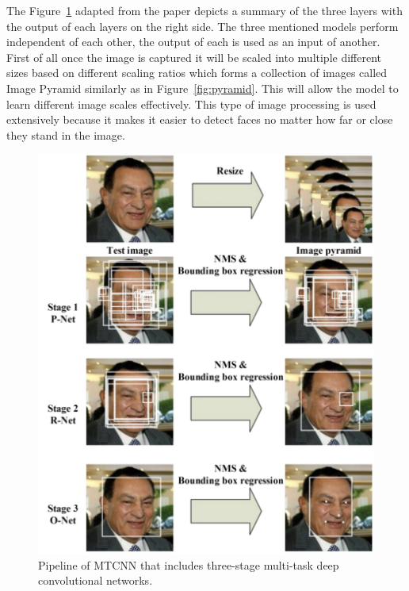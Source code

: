 The Figure~\ref{fig:mtcnn} adapted from the paper depicts a summary of the three layers with the output of each layers on the right side. The three mentioned models perform independent of each other, the output of each is used as an input of another. 
First of all once the image is captured it will be scaled into multiple different sizes based on different scaling ratios which forms a collection of images called Image Pyramid similarly as in Figure~\ref{fig:pyramid}. This will allow the model to learn different image scales effectively. This type of image processing is used extensively because it makes it easier to detect faces no matter how far or close they stand in the image.


\begin{figure}[!htb]
    \centering
    \includegraphics[width=1\textwidth]{figures/mtcnn.png}
    \caption{ Pipeline of MTCNN that includes three-stage multi-task deep convolutional networks.}
    \label{fig:mtcnn}
\end{figure}

